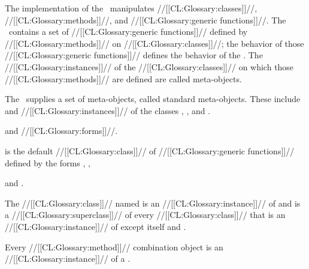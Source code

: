 

The implementation of the \OS\ manipulates //[[CL:Glossary:classes]]//, //[[CL:Glossary:methods]]//, and //[[CL:Glossary:generic functions]]//.  The \OS\ contains a set of  //[[CL:Glossary:generic functions]]// defined by //[[CL:Glossary:methods]]// on //[[CL:Glossary:classes]]//;  the behavior of those //[[CL:Glossary:generic functions]]// defines the behavior of the \OS.  The //[[CL:Glossary:instances]]// of the //[[CL:Glossary:classes]]// on which those //[[CL:Glossary:methods]]// are defined are called meta-objects.  


The \OS\ supplies a set of meta-objects, called standard meta-objects. These include  and //[[CL:Glossary:instances]]// of the classes ,  , and .

\beginlist

  and
  //[[CL:Glossary:forms]]//. 



\itemitem{\bull}  is the default //[[CL:Glossary:class]]// of  //[[CL:Glossary:generic functions]]// defined by the forms
  ,
  , 


 and
  .

\itemitem{\bull} The //[[CL:Glossary:class]]// named   is an //[[CL:Glossary:instance]]// of   and is a //[[CL:Glossary:superclass]]// of every //[[CL:Glossary:class]]// that is an //[[CL:Glossary:instance]]// of  except itself and  .

\itemitem{\bull} Every //[[CL:Glossary:method]]// combination object is  an //[[CL:Glossary:instance]]// of a .

\endlist

\endsubsection%


